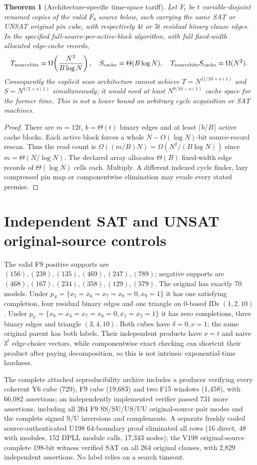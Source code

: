\documentclass[11pt]{article}
\newtheorem{theorem}{Theorem}
\begin{document}
\begin{theorem}[Architecture-specific time-space tariff]
Let $F_t$ be $t$ variable-disjoint renamed copies of the valid $F_9$ source below, each carrying the same SAT or UNSAT original pin cube, with respectively $4t$ or $3t$ residual binary clause edges. In the \emph{specified} full-source-per-active-block algorithm, with full fixed-width allocated edge-cache records,
\[
T_{\rm sourcebits}=\Omega\!\left(\frac{N^2}{B\log N}\right),\quad
S_{\rm cache}=\Theta(B\log N),\quad T_{\rm sourcebits}S_{\rm cache}=\Omega(N^2).
\]
Consequently the explicit scan architecture cannot achieve $T=N^{11/10+o(1)}$ and $S=N^{1/2+o(1)}$ simultaneously; it would need at least $N^{9/10-o(1)}$ cache space for the former time. This is \emph{not} a lower bound on arbitrary cycle acquisition or SAT machines.
\end{theorem}
\begin{proof}
There are $m=12t$, $b=\Theta(t)$ binary edges and at least $\lceil b/B\rceil$ active cache blocks. Each active block forces a whole $N-O(\log N)$-bit source-record rescan. Thus the read count is $\Omega((m/B)N)=\Omega(N^2/(B\log N))$ since $m=\Theta(N/\log N)$. The declared array allocates $\Theta(B)$ fixed-width edge records of $\Theta(\log N)$ cells each. Multiply. A different indexed cycle finder, lazy compressed pin map or componentwise elimination may evade every stated premise. \end{proof}

\section{Independent SAT and UNSAT original-source controls}
The valid F9 positive supports are $(156),(238),(135),(469),(247),(789)$; negative supports are $(468),(167),(234),(358),(129),(579)$. The original has exactly 70 models. Under $p_S=\{x_5=x_6=x_7=x_8=0,x_9=1\}$ it has one satisfying completion, four residual binary edges and one triangle on 0-based IDs $(1,2,10)$. Under $p_U=\{x_8=x_3=x_7=x_6=0,x_1=x_5=1\}$ it has zero completions, three binary edges and triangle $(3,4,10)$. Both cubes have $\delta=0,\nu=1$; the same original parent has both labels. Their independent products have $\nu=t$ and naive $3^t$ edge-choice vectors, while componentwise exact checking can shortcut their product after paying decomposition, so this is not intrinsic exponential-time hardness.

The complete attached reproducibility archive includes a producer verifying every coherent Y6 cube (729), F9 cube (19,683) and two F15 windows (1,458), with 66,082 assertions; an independently implemented verifier passed 731 more assertions, including all 264 F9 SS/SU/US/UU original-source pair modes and the complete signed S/U inversions and complements. A separate freshly coded source-authenticated U198 64-boundary proof eliminated all rows (16 direct, 48 with modules, 152 DPLL module calls, 17,343 nodes); the V198 original-source complete 198-bit witness verified SAT on all 264 original clauses, with 2,829 independent assertions. No label relies on a search timeout.
\end{document}
